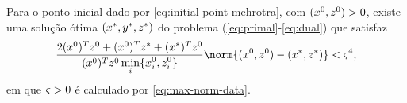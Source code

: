 \begin{cond} \label{cond:xzzero-xzstar} Para o ponto inicial dado por \eqref{eq:initial-point-mehrotra}, com $(x^0,z^0)>0$,  existe uma solução ótima $(x^*,y^*,z^*)$  do problema (\ref{eq:primal}-\ref{eq:dual}) que satisfaz 
\begin{equation}
	 	\label{eq:cond:xzzero-xzstar}
	 		\dfrac{2(\xzero)^T\zzero  + (\xzero)^T\zstar + (\xstar)^T\zzero}{(\xzero)^T\zzero \minxzinit} \norm{(\xzero,\zzero) - (\xstar,\zstar)} < \bdxzstar^{4},
\end{equation}
em que  $\varsigma>0$ é calculado por \eqref{eq:max-norm-data}. 
\end{cond}

















